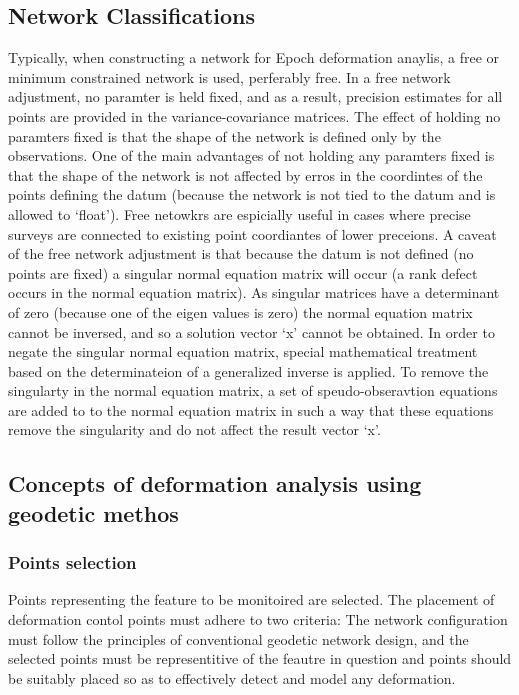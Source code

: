 \documentclass{article}
\begin{document}
\subsection{Network Classifications}
Typically, when constructing a network for Epoch deformation anaylis,
a free or minimum constrained network is used, perferably free. In a free
network adjustment, no paramter is held fixed, and as a result, precision
estimates for all points are provided in the variance-covariance matrices.
The effect of holding no paramters fixed is that the shape of the network
is defined only by the observations. One of the main advantages of not holding
any paramters fixed is that the shape of the network is not affected by erros in
the coordintes of the points defining the datum (because the network is not tied
to the datum and is allowed to `float'). Free netowkrs are espicially useful
in cases where precise surveys are connected to existing point coordiantes
of lower preceions. A caveat of the free network adjustment is that because the
datum is not defined (no points are fixed) a singular normal equation matrix
will occur (a rank defect occurs in the normal equation matrix).
As singular matrices have a determinant of zero (because one of the
eigen values is zero) the normal equation matrix cannot be inversed, and so
a solution vector `x' cannot be obtained. In order to negate the singular normal
equation matrix, special mathematical treatment based on the determinateion of a
generalized inverse is applied. To remove the singularty in the normal equation
matrix, a set of speudo-obseravtion equations are added to to the normal
equation matrix in such a way that these equations remove the singularity and
do not affect the result vector `x'.

\subsection{Concepts of deformation analysis using geodetic methos}

\subsubsection{Points selection}
Points representing the feature to be monitoired are selected.
The placement of deformation contol points must adhere to two criteria:
The network configuration must follow the principles of conventional geodetic
network design, and the selected points must be representitive of the feautre
in question and points should be suitably placed so as to effectively detect and
model any deformation.
\end{document}
